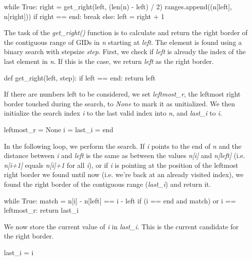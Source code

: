 \documentclass{frontiersSCNS} %
\begin{document}
\begin{pythoncode}
while True:
    right = get_right(left, (len(n) - left) / 2)
    ranges.append((n[left], n[right]))
    if right == end:
        break
    else:
        left = right + 1
\end{pythoncode}

The task of the \emph{get\_right()} function is to calculate and
return the right border of the contiguous range of GIDs in \emph{n}
starting at \emph{left}. The element is found using a binary search
with stepsize \emph{step}. First, we check if \emph{left} is already
the index of the last element in \emph{n}. If this is the case, we
return \emph{left} as the right border.

\begin{pythoncode}
def get_right(left, step):
    if left == end:
        return left
\end{pythoncode}

If there are numbers left to be considered, we set \emph{leftmost\_r},
the leftmost right border touched during the search, to \emph{None} to
mark it as unitialized. We then initialize the search index \emph{i}
to the last valid index into \emph{n}, and \emph{last\_i} to \emph{i}.

\begin{pythoncode}
    leftmost_r = None
    i = last_i = end
\end{pythoncode}

In the following loop, we perform the search. If \emph{i} points to
the end of \emph{n} and the distance between \emph{i} and \emph{left}
is the same as between the values \emph{n[i]} and \emph{n[left]}
(i.e. \emph{n[i+1]} equals \emph{n[i]+1} for all \emph{i}), or if
\emph{i} is pointing at the position of the leftmost right border we
found until now (i.e. we're back at an already visited index), we
found the right border of the contiguous range (\emph{last\_i}) and
return it.

\begin{pythoncode}
    while True:
        match = n[i] - n[left] == i - left
        if (i == end and match) or i == leftmost_r:
            return last_i
\end{pythoncode}

We now store the current value of \emph{i} in \emph{last\_i}. This is
the current candidate for the right border.

\begin{pythoncode}
        last_i = i 
\end{pythoncode}
\end{document}
